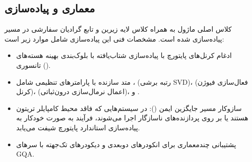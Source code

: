 \subsection{معماری و پیاده‌سازی}
کلاس اصلی ماژول  به همراه کلاس لایه زیرین  و تابع گرادیان سفارشی  در مسیر  پیاده‌سازی شده است. مشخصات فنی این پیاده‌سازی شامل موارد زیر است:
\begin{itemize}
    \item ادغام کرنل‌های پایتورچ با پیاده‌سازی شتاب‌یافته  با بلوک‌بندی بهینه هسته‌های تانسوری ().
    \item متد سازنده با پارامترهای تنظیمی شامل ،  (رتبه برشی SVD)،  (فعال‌سازی فیوژن کرنل)،  (اعمال نرمال‌سازی درون‌ثباتی)، و .
    \item سازوکار مسیر جایگزین ایمن (): در سیستم‌هایی که فاقد محیط کامپایلر تریتون هستند یا بر روی پردازنده‌های ناسازگار اجرا می‌شوند، فرآیند به صورت خودکار به پیاده‌سازی استاندارد پایتورچ شیفت می‌یابد.
    \item پشتیبانی چندمعماری برای انکودرهای دوبعدی و دیکودرهای تک‌جهته با سرهای GQA.
\end{itemize}
